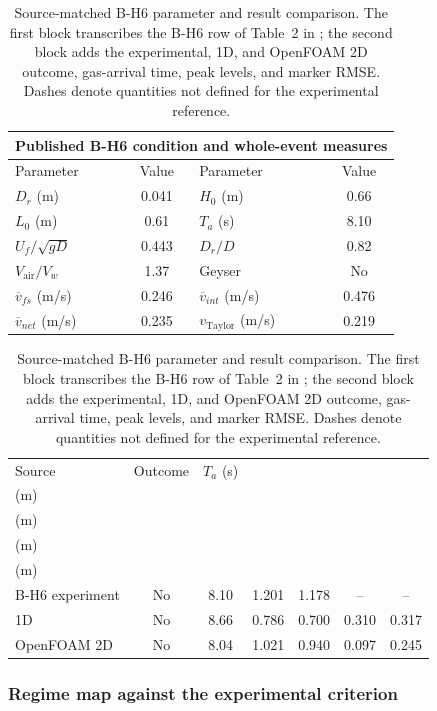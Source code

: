 \begin{table}[htbp]
\centering
\caption{Source-matched B-H6 parameter and result comparison. The first block
transcribes the B-H6 row of Table~2 in \cite{cong2017}; the second block adds
the experimental, 1D, and OpenFOAM 2D outcome, gas-arrival time, peak levels,
and marker RMSE. Dashes denote quantities not defined for the experimental
reference.}
\label{tab:cong_bh6_source_matched}
\small
\begin{tabular}{@{}lclc@{}}
\toprule
\multicolumn{4}{c}{Published B-H6 condition and whole-event measures} \\
\midrule
Parameter & Value & Parameter & Value \\
\midrule
$D_r$ (m) & 0.041 & $H_0$ (m) & 0.66 \\
$L_0$ (m) & 0.61 & $T_a$ (s) & 8.10 \\
$U_f/\sqrt{gD}$ & 0.443 & $D_r/D$ & 0.82 \\
$V_{\mathrm{air}}/V_w$ & 1.37 & Geyser & No \\
$\overline{v}_{fs}$ (m/s) & 0.246 & $\overline{v}_{int}$ (m/s) & 0.476 \\
$\overline{v}_{net}$ (m/s) & 0.235 & $v_{\mathrm{Taylor}}$ (m/s) & 0.219 \\
\bottomrule
\end{tabular}

\vspace{0.7em}

\begingroup
\footnotesize
\setlength{\tabcolsep}{2.5pt}
\begin{tabular}{@{}lcccccc@{}}
\toprule
Source & Outcome & $T_a$ (s) &
\shortstack{$Y_{fs,\max}$\\(m)} &
\shortstack{$Y_{int,\max}$\\(m)} &
\shortstack{RMSE $Y_{fs}$\\(m)} &
\shortstack{RMSE $Y_{int}$\\(m)} \\
\midrule
B-H6 experiment & No & 8.10 & 1.201 & 1.178 & -- & -- \\
1D & No & 8.66 & 0.786 & 0.700 & 0.310 & 0.317 \\
OpenFOAM 2D & No & 8.04 & 1.021 & 0.940 & 0.097 & 0.245 \\
\bottomrule
\end{tabular}
\endgroup
\end{table}

\FloatBarrier

\subsubsection{Regime map against the experimental criterion}
\label{sec:tests:cong2017:map}

